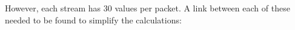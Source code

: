However, each stream has 30 values per packet. A link between each of these needed to be found to simplify the calculations:
